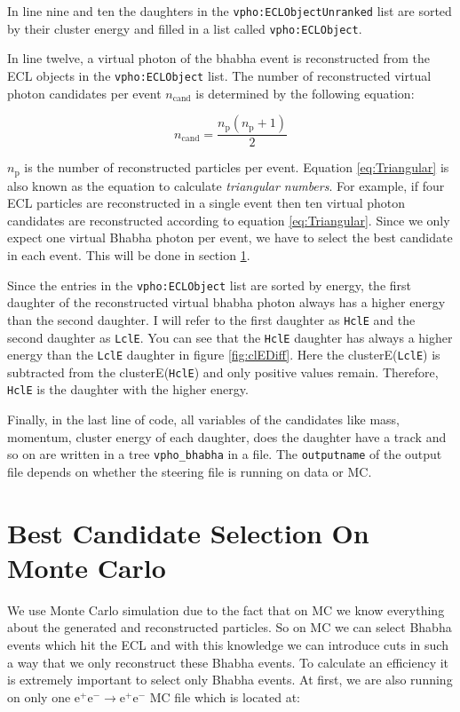 \documentclass[a4paper,11pt,twosided,final,german,openbib,pdftex,listof=totoc,bibliography=totoc]{scrbook}
\begin{document}
In line nine and ten the daughters in the \texttt{vpho:ECLObjectUnranked} list are sorted by their cluster energy and filled in a list called \texttt{vpho:ECLObject}.

In line twelve, a virtual photon of the bhabha event is reconstructed from the ECL objects in the \texttt{vpho:ECLObject} list. The number of reconstructed virtual photon candidates per event $n_{\textrm{cand}}$ is determined by the following equation\cite{triangular}:

\begin{equation}
n_{\textrm{cand}} = \frac{n_{\textrm{p}}(n_{\textrm{p}} +1)}{2}
\label{eq:Triangular}
\end{equation}

$n_{\textrm{p}}$ is the number of reconstructed particles per event. Equation \ref{eq:Triangular} is also known as the equation to calculate \textit{triangular numbers}. For example, if four ECL particles are reconstructed in a single event then ten virtual photon candidates are reconstructed according to equation \ref{eq:Triangular}. Since we only expect one virtual Bhabha photon per event, we have to select the best candidate in each event. This will be done in section \ref{sec:SelectingBhabhaMC}.

Since the entries in the \texttt{vpho:ECLObject} list are sorted by energy, the first daughter of the reconstructed virtual bhabha photon always has a higher energy than the second daughter. I will refer to the first daughter as \texttt{HclE} and the second daughter as \texttt{LclE}. You can see that the \texttt{HclE} daughter has always a higher energy than the \texttt{LclE} daughter in figure \ref{fig:clEDiff}. Here the clusterE(\texttt{LclE}) is subtracted from the clusterE(\texttt{HclE}) and only positive values remain. Therefore, \texttt{HclE} is the daughter with the higher energy.

Finally, in the last line of code, all variables of the candidates like mass, momentum, cluster energy of each daughter, does the daughter have a track and so on are written in a tree \texttt{vpho\_bhabha} in a file. The \texttt{outputname} of the output file depends on whether the steering file is running on data or MC. 


\section{Best Candidate Selection On Monte Carlo}
\label{sec:SelectingBhabhaMC}

We use Monte Carlo simulation due to the fact that on MC we know everything about the generated and reconstructed particles. So on MC we can select Bhabha events which hit the ECL and with this knowledge we can introduce cuts in such a way that we only reconstruct these Bhabha events. To calculate an efficiency it is extremely  important to select only Bhabha events. At first, we are also running on only one $\textrm{e}^+ \textrm{e}^- \rightarrow \textrm{e}^+ \textrm{e}^-$ MC file which is located at:
\newline
\end{document}

